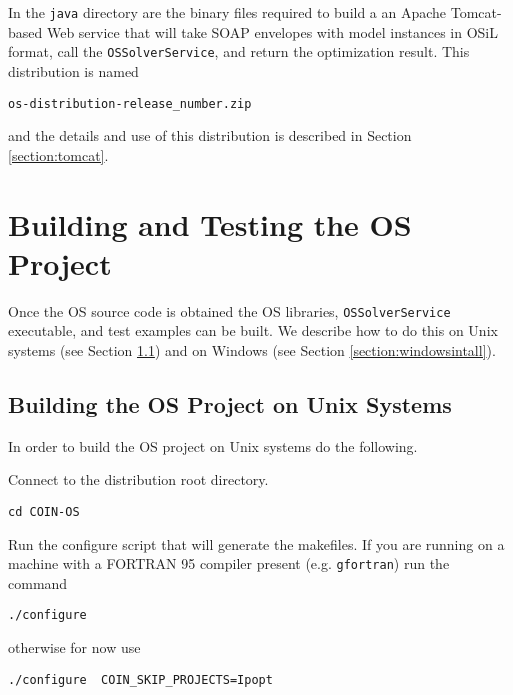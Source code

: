 \documentclass[11pt]{article}
\renewcommand{\_}{{\char"5F}}
\renewcommand{\{}{{\char"7B}}
\renewcommand{\}}{{\char"7D}}
\renewcommand{\^}{{\char"0D}}
\renewcommand{\'}{{\char"0D}}
\begin{document}
In the {\tt java} directory  are the binary files required to build a an Apache Tomcat-based Web service that will take SOAP envelopes with model instances in OSiL format, call the {\tt OSSolverService}, and return the optimization result.  This distribution is named
\begin{verbatim}
os-distribution-release_number.zip
\end{verbatim}
and the details and use of this distribution is described in Section \ref{section:tomcat}.



\section{Building and Testing the OS Project}\label{section:build}


Once the OS source code is obtained the OS libraries, {\tt OSSolverService} executable, and test examples can be built.  We describe how to do this on Unix systems (see Section \ref{section:unixbuilds})  and on Windows (see Section \ref{section:windowsintall}).

\subsection{Building the OS Project on Unix Systems}\label{section:unixbuilds}

In order to build the OS project on Unix systems do the following.

\vskip 8pt


  Connect to the distribution root directory.

\begin{verbatim}
cd COIN-OS
\end{verbatim}


 Run the configure script that will generate the makefiles.  If you are running on a machine with a FORTRAN 95 compiler present (e.g. {\tt gfortran}) run the command

\begin{verbatim}
./configure
\end{verbatim}

\noindent otherwise for now use

\begin{verbatim}
./configure  COIN_SKIP_PROJECTS=Ipopt
\end{verbatim}

\end{document}

